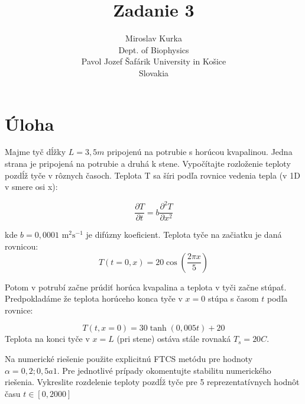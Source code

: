 \documentclass{article}
\title{Zadanie 3}
\author{Miroslav Kurka\\
  \small Dept. of Biophysics\\
  \small Pavol Jozef Šafárik University in Košice\\
  \small Slovakia 
}
\theoremstyle{definition}
\theoremstyle{remark}
\begin{document}
\maketitle


\section{Úloha}
Majme tyč dĺžky $L = 3,5 m$ pripojenú na potrubie s horúcou kvapalinou. Jedna strana je
pripojená na potrubie a druhá k stene. Vypočítajte rozloženie teploty pozdĺž tyče
v rôznych časoch.
Teplota T sa šíri podľa rovnice vedenia tepla (v 1D v smere osi x):

$$\frac{\partial T}{\partial t} = b \frac{\partial^2 T}{\partial x^2}$$


kde $b = 0,0001 \text{ m}^2\text{s}^{-1}$ je difúzny koeficient. Teplota tyče na začiatku je daná rovnicou:
$$T(t=0,x) = 20\cos\left(\frac{2\pi x}{5}\right)$$

Potom v potrubí začne prúdiť horúca kvapalina a teplota v tyči začne stúpať.
Predpokladáme že teplota horúceho konca tyče v $x = 0$ stúpa s časom $t$ podľa rovnice:

$$T(t,x=0) = 30 \tanh(0,005t) + 20$$
Teplota na konci tyče v $x = L$ (pri stene) ostáva stále rovnaká $T_s = 20C$.

Na numerické riešenie použite explicitnú FTCS metódu pre hodnoty $\alpha = 0,2; 0,5 a 1$.
Pre jednotlivé prípady okomentujte stabilitu numerického riešenia. Vykreslite
rozdelenie teploty pozdĺž tyče pre 5 reprezentatívnych hodnôt času $t \in [0, 2000]$
\end{document}
